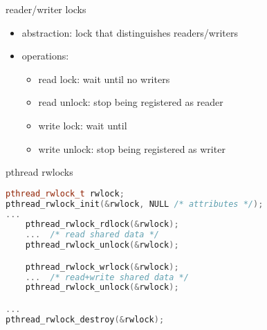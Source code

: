 \begin{frame}{reader/writer locks}
\begin{itemize}
\item abstraction: lock that distinguishes readers/writers
\item operations:
    \begin{itemize}
    \item read lock: wait until no writers
    \item read unlock: stop being registered as reader
    \item write lock: wait until 
    \item write unlock: stop being registered as writer
    \end{itemize}
\end{itemize}
\end{frame}

\begin{frame}[fragile,label=pthreadrwlock]{pthread rwlocks}
\begin{lstlisting}[language=C++,style=smaller]
pthread_rwlock_t rwlock;
pthread_rwlock_init(&rwlock, NULL /* attributes */);
...
    pthread_rwlock_rdlock(&rwlock);
    ...  /* read shared data */
    pthread_rwlock_unlock(&rwlock);

    pthread_rwlock_wrlock(&rwlock);
    ...  /* read+write shared data */
    pthread_rwlock_unlock(&rwlock);

...
pthread_rwlock_destroy(&rwlock);
\end{lstlisting}
\end{frame}
